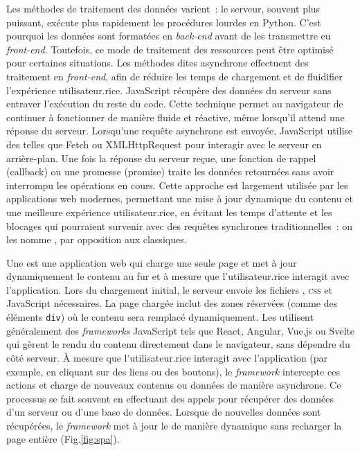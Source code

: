 Les méthodes de traitement des données varient~: le serveur, souvent
plus puissant, exécute plus rapidement les procédures lourdes en Python.
C'est pourquoi les données sont formatées en \textit{back-end} avant de les
transmettre eu \textit{front-end}. Toutefois, ce mode de traitement des
ressources peut être optimisé pour certaines situations. Les méthodes
dites asynchrone effectuent des traitement en \textit{front-end}, afin de réduire
les temps de chargement et de fluidifier l'expérience utilisateur.rice.
JavaScript récupère des données du serveur sans entraver l'exécution du
reste du code. Cette technique permet au navigateur de continuer à
fonctionner de manière fluide et réactive, même lorsqu'il attend une
réponse du serveur. Lorsqu'une requête asynchrone est envoyée,
JavaScript utilise des \apis telles que Fetch ou XMLHttpRequest pour
interagir avec le serveur en arrière-plan. Une fois la réponse du
serveur reçue, une fonction de rappel (callback) ou une promesse
(promise) traite les données retournées sans avoir interrompu les
opérations en cours. Cette approche est largement utilisée par les
applications web modernes, permettant une mise à jour dynamique du
contenu et une meilleure expérience utilisateur.rice, en évitant les temps
d'attente et les blocages qui pourraient survenir avec des requêtes
synchrones traditionnelles~: on les nomme \spa, par opposition aux \mpa classiques.

Une \spa est une application web qui charge
une seule page \html et met à jour dynamiquement le contenu au fur et à
mesure que l'utilisateur.rice interagit avec l'application. Lors du
chargement initial, le serveur envoie les fichiers \html, \textsc{css} et
JavaScript nécessaires. La page \html chargée inclut des zones réservées
(comme des éléments \texttt{div}) où le contenu sera remplacé dynamiquement. Les \spa utilisent
généralement des \textit{frameworks} JavaScript tels que React, Angular, Vue.js
ou Svelte qui gèrent le rendu du contenu directement dans le navigateur,
sans dépendre du côté serveur. À mesure que l'utilisateur.rice interagit avec
l'application (par exemple, en cliquant sur des liens ou des boutons),
le \textit{framework} intercepte ces actions et charge de nouveaux contenus ou
données de manière asynchrone. Ce processus se fait souvent en
effectuant des appels \api pour récupérer des données d'un serveur ou
d'une base de données. Lorsque de nouvelles données sont récupérées, le
\textit{framework} met à jour le \dom de manière dynamique sans recharger la page
entière (Fig.\ref{fig:spa}).

